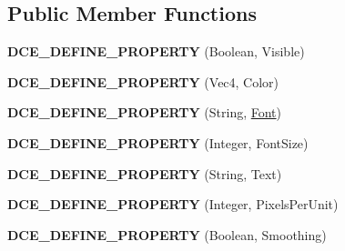 \subsection*{Public Member Functions}
\begin{DoxyCompactItemize}
\item 
\hypertarget{classDCEngine_1_1Components_1_1SpriteText_a100dc8078d979431aefc43cae4a9a5bd}{{\bfseries D\-C\-E\-\_\-\-D\-E\-F\-I\-N\-E\-\_\-\-P\-R\-O\-P\-E\-R\-T\-Y} (Boolean, Visible)}\label{classDCEngine_1_1Components_1_1SpriteText_a100dc8078d979431aefc43cae4a9a5bd}

\item 
\hypertarget{classDCEngine_1_1Components_1_1SpriteText_a679523d2c800da423ab623b0649a3a02}{{\bfseries D\-C\-E\-\_\-\-D\-E\-F\-I\-N\-E\-\_\-\-P\-R\-O\-P\-E\-R\-T\-Y} (Vec4, Color)}\label{classDCEngine_1_1Components_1_1SpriteText_a679523d2c800da423ab623b0649a3a02}

\item 
\hypertarget{classDCEngine_1_1Components_1_1SpriteText_a6a05f0c7d35b067ef15f60cae784536b}{{\bfseries D\-C\-E\-\_\-\-D\-E\-F\-I\-N\-E\-\_\-\-P\-R\-O\-P\-E\-R\-T\-Y} (String, \hyperlink{classDCEngine_1_1Font}{Font})}\label{classDCEngine_1_1Components_1_1SpriteText_a6a05f0c7d35b067ef15f60cae784536b}

\item 
\hypertarget{classDCEngine_1_1Components_1_1SpriteText_a4b82dff41c61d261e974110c3eb69af3}{{\bfseries D\-C\-E\-\_\-\-D\-E\-F\-I\-N\-E\-\_\-\-P\-R\-O\-P\-E\-R\-T\-Y} (Integer, Font\-Size)}\label{classDCEngine_1_1Components_1_1SpriteText_a4b82dff41c61d261e974110c3eb69af3}

\item 
\hypertarget{classDCEngine_1_1Components_1_1SpriteText_a715f583f77fc752061bc6563bb4dcccd}{{\bfseries D\-C\-E\-\_\-\-D\-E\-F\-I\-N\-E\-\_\-\-P\-R\-O\-P\-E\-R\-T\-Y} (String, Text)}\label{classDCEngine_1_1Components_1_1SpriteText_a715f583f77fc752061bc6563bb4dcccd}

\item 
\hypertarget{classDCEngine_1_1Components_1_1SpriteText_a8da113292f8d1177d44b47abdbb1fc85}{{\bfseries D\-C\-E\-\_\-\-D\-E\-F\-I\-N\-E\-\_\-\-P\-R\-O\-P\-E\-R\-T\-Y} (Integer, Pixels\-Per\-Unit)}\label{classDCEngine_1_1Components_1_1SpriteText_a8da113292f8d1177d44b47abdbb1fc85}

\item 
\hypertarget{classDCEngine_1_1Components_1_1SpriteText_acff42f47ab24608a2536e7df5fe75da1}{{\bfseries D\-C\-E\-\_\-\-D\-E\-F\-I\-N\-E\-\_\-\-P\-R\-O\-P\-E\-R\-T\-Y} (Boolean, Smoothing)}\label{classDCEngine_1_1Components_1_1SpriteText_acff42f47ab24608a2536e7df5fe75da1}


\end{DoxyCompactItemize}
